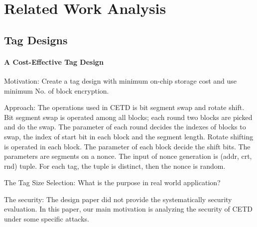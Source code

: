 \documentclass{article}
\begin{document}
\section{Related Work Analysis}
\subsection{Tag Designs}
\paragraph{A Cost-Effective Tag Design}
Motivation: Create a tag design with minimum on-chip storage cost and use
minimum No. of block encryption.

Approach: The operations used in CETD is bit segment swap and rotate shift. Bit segment swap is operated among all blocks; each round two blocks are picked and do the swap. The parameter of each round decides the indexes of blocks to swap, the index of start bit in each block and the segment length. Rotate shifting is operated in each block. The parameter of each block decide the shift bits.
The parameters are segments on a nonce. The input of nonce generation is (addr, crt, rnd) tuple. For each tag, the tuple is distinct, then the nonce is random.

The Tag Size Selection: What is the purpose in real world application?

The security: The design paper did not provide the systematically security evaluation. In this paper, our main motivation is analyzing the security of CETD under some specific attacks.
\end{document}
